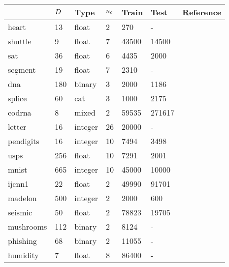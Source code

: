 \begin{tabular}{|l|llllll|}
	\hline
	& $D$ & Type & $n_c$ & Train & Test & Reference \\\hline
	heart & 13 & float & 2 & 270 & - & {\small \citep{Lichman2013}}\\
	shuttle & 9 & float & 7 & 43500 & 14500 & {\small \citep{King_etal1995}}\\
	sat & 36 & float & 6 & 4435 & 2000 & {\small \citep{King_etal1995}}\\
	segment & 19 & float & 7 & 2310 & - & {\small \citep{King_etal1995}} \\
	dna & 180 & binary & 3 & 2000 & 1186 & {\small \citep{Michie_etal1994}}\\
	splice &  60 & cat & 3 & 1000 & 2175 & {\small \citep{Michie_etal1994}}\\
	codrna &  8 & mixed & 2 & 59535 & 271617 & {\small \citep{Uzilov_etal2006}}\\
	letter &  16 & integer & 26 & 20000 & - & {\small \citep{Frey_Slate1991}}\\
	pendigits & 16 & integer & 10 & 7494 & 3498 & {\small \citep{Alimoglu1996}}\\
	usps & 256 & float & 10 & 7291 & 2001 & {\small \citep{Hull1994}}\\
	mnist & 665 & integer & 10 & 45000 & 10000 & {\small \citep{LeCun_etal1998}}\\
	ijcnn1 & 22 & float & 2 & 49990 & 91701 & {\small \citep{Feldkamp_Puskorius1998}}\\
	madelon & 500 & integer & 2 & 2000 & 600 & {\small \citep{Guyon_etal2004}}\\
	seismic & 50 & float & 2 & 78823 & 19705 & {\small \citep{Duarte_Hu2004}}\\
	mushrooms & 112 & binary & 2 & 8124 & - & {\small \citep{Iba_etal1988}}\\
	phishing & 68 & binary & 2 & 11055 & - & {\small \citep{Mohommad_etal2014}}\\
	humidity & 7 & float & 8 & 86400 & - & {\small \citep{Mills2009}}\\
	\hline
\end{tabular}

